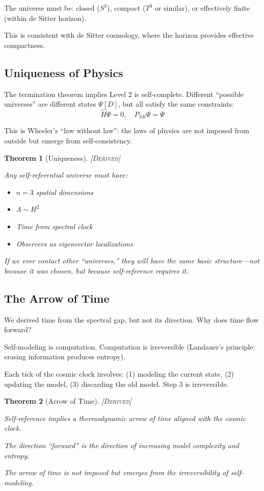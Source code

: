 \documentclass[11pt,a4paper]{article}
\newtheorem{theorem}{Theorem}[section]
\theoremstyle{definition}
\theoremstyle{remark}
\begin{document}
The universe must be: closed ($S^3$), compact ($T^3$ or similar), or effectively finite (within de Sitter horizon).

This is consistent with de Sitter cosmology, where the horizon provides effective compactness.

\subsection{Uniqueness of Physics}

The termination theorem implies Level 2 is self-complete. Different ``possible universes'' are different states $\Psi[D]$, but all satisfy the same constraints:
\[
\hat{H}\Psi = 0, \quad P_{SR}\Psi = \Psi
\]

This is Wheeler's ``law without law'': the laws of physics are not imposed from outside but emerge from self-consistency.

\begin{theorem}[Uniqueness]
\textsc{[Derived]}

Any self-referential universe must have:
\begin{itemize}
    \item $n = 3$ spatial dimensions
    \item $\Lambda \sim H^2$
    \item Time from spectral clock
    \item Observers as eigenvector localizations
\end{itemize}

If we ever contact other ``universes,'' they will have the same basic structure---not because it was chosen, but because self-reference requires it.
\end{theorem}

\subsection{The Arrow of Time}

We derived time from the spectral gap, but not its direction. Why does time flow forward?

Self-modeling is computation. Computation is irreversible (Landauer's principle: erasing information produces entropy).

Each tick of the cosmic clock involves: (1) modeling the current state, (2) updating the model, (3) discarding the old model. Step 3 is irreversible.

\begin{theorem}[Arrow of Time]
\textsc{[Derived]}

Self-reference implies a thermodynamic arrow of time aligned with the cosmic clock.

The direction ``forward'' is the direction of increasing model complexity and entropy.

The arrow of time is not imposed but emerges from the irreversibility of self-modeling.
\end{theorem}
\end{document}
